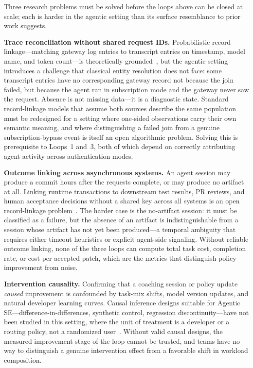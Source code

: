 \documentclass[sigconf,anonymous,review]{acmart}
\begin{document}
Three research problems must be solved before the loops above can
be closed at scale; each is harder in the agentic setting than its
surface resemblance to prior work suggests.

\textbf{Trace reconciliation without shared request IDs.}
Probabilistic record linkage---matching gateway log entries to
transcript entries on timestamp, model name, and token count---is
theoretically grounded~\cite{fellegi1969theory, splink2022}, but
the agentic setting introduces a challenge that classical entity
resolution does not face: some transcript entries have no
corresponding gateway record not because the join failed, but
because the agent ran in subscription mode and the gateway never
saw the request. Absence is not missing data---it is a diagnostic
state. Standard record-linkage models that assume both sources
describe the same population must be redesigned for a setting where
one-sided observations carry their own semantic meaning, and where
distinguishing a failed join from a genuine subscription-bypass
event is itself an open algorithmic problem. Solving this is
prerequisite to Loops~1 and~3, both of which depend on correctly
attributing agent activity across authentication modes.

\textbf{Outcome linking across asynchronous systems.}
An agent session may produce a commit hours after the requests
complete, or may produce no artifact at all. Linking runtime
transactions to downstream test results, PR reviews, and human
acceptance decisions without a shared key across all systems is an
open record-linkage problem~\cite{linktransformer2024}. The harder
case is the no-artifact session: it must be classified as a failure,
but the absence of an artifact is indistinguishable from a session
whose artifact has not yet been produced---a temporal ambiguity that
requires either timeout heuristics or explicit agent-side signaling.
Without reliable outcome linking, none of the three loops can
compute total task cost, completion rate, or cost per accepted
patch, which are the metrics that distinguish policy improvement
from noise.

\textbf{Intervention causality.}
Confirming that a coaching session or policy update \emph{caused}
improvement is confounded by task-mix shifts, model version updates,
and natural developer learning curves. Causal inference designs
suitable for Agentic SE---difference-in-differences, synthetic
control, regression discontinuity---have not been studied in this
setting, where the unit of treatment is a developer or a routing
policy, not a randomized user~\cite{trail2025}. Without valid
causal designs, the measured improvement stage of the loop cannot
be trusted, and teams have no way to distinguish a genuine
intervention effect from a favorable shift in workload composition.
\end{document}
